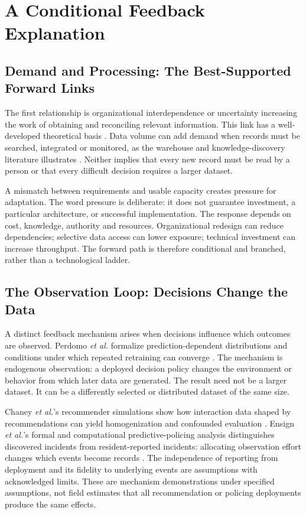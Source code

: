 \documentclass[journal]{IEEEtran}
\begin{document}
\section{A Conditional Feedback Explanation}
\subsection{Demand and Processing: The Best-Supported Forward Links}
The first relationship is organizational interdependence or uncertainty increasing the work of obtaining and reconciling relevant information. This link has a well-developed theoretical basis \cite{GALBRAITH1974,TUSHMAN1978}. Data volume can add demand when records must be searched, integrated or monitored, as the warehouse and knowledge-discovery literature illustrates \cite{chaudhuri1997,fayyad1996}. Neither implies that every new record must be read by a person or that every difficult decision requires a larger dataset.

A mismatch between requirements and usable capacity creates pressure for adaptation. The word pressure is deliberate: it does not guarantee investment, a particular architecture, or successful implementation. The response depends on cost, knowledge, authority and resources. Organizational redesign can reduce dependencies; selective data access can lower exposure; technical investment can increase throughput. The forward path is therefore conditional and branched, rather than a technological ladder.

\subsection{The Observation Loop: Decisions Change the Data}
A distinct feedback mechanism arises when decisions influence which outcomes are observed. Perdomo \emph{et al.} formalize prediction-dependent distributions and conditions under which repeated retraining can converge \cite{perdomo2020}. The mechanism is endogenous observation: a deployed decision policy changes the environment or behavior from which later data are generated. The result need not be a larger dataset. It can be a differently selected or distributed dataset of the same size.

Chaney \emph{et al.}'s recommender simulations show how interaction data shaped by recommendations can yield homogenization and confounded evaluation \cite{chaney2018}. Ensign \emph{et al.}'s formal and computational predictive-policing analysis distinguishes discovered incidents from resident-reported incidents: allocating observation effort changes which events become records \cite{ensign2018}. The independence of reporting from deployment and its fidelity to underlying events are assumptions with acknowledged limits. These are mechanism demonstrations under specified assumptions, not field estimates that all recommendation or policing deployments produce the same effects.
\end{document}
